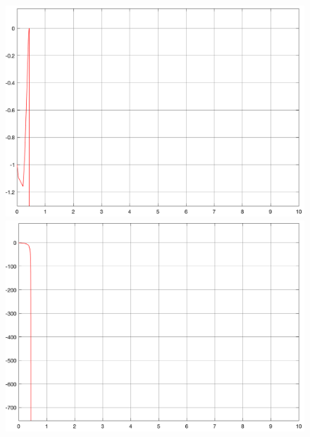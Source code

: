 \documentclass[11pt]{article}
\begin{document}
\begin{enumerate}
\begin{figure}[htbp!]
{\begin{minipage}[b]{.3\linewidth}
					\centering
					\includegraphics[scale=0.1]{x_2_-1-1.png}
				\end{minipage}
				\begin{minipage}[b]{.3\linewidth}
					\centering
					\includegraphics[scale=0.1]{y_2_-1-1.png}
				\end{minipage}
			}
\end{figure}
\end{enumerate}
\end{document}
